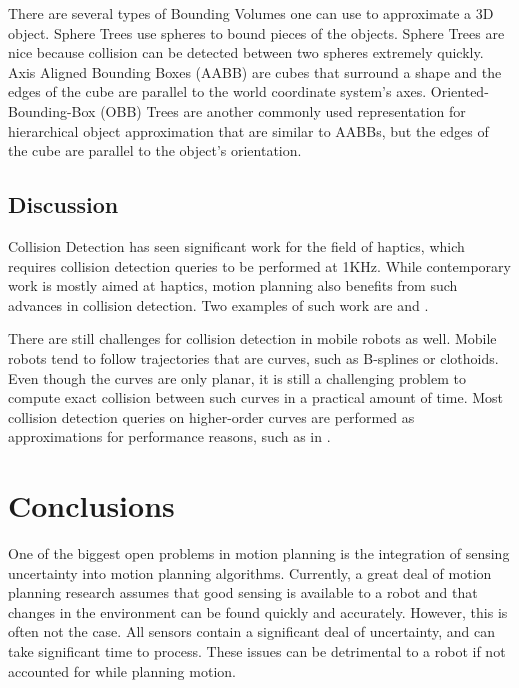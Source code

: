 \documentclass[10pt,conference]{ieeeconf}
\begin{document}
	There are several types of Bounding Volumes one can use to approximate a 3D object. Sphere Trees \cite{hubbard1996approximating} use spheres to bound pieces of the objects. Sphere Trees are nice because collision can be detected between two spheres extremely quickly. Axis Aligned Bounding Boxes (AABB) \cite{edelsbrunner1981intersection} are cubes that surround a shape and the edges of the cube are parallel to the world coordinate system's axes. Oriented-Bounding-Box (OBB) Trees \cite{gottschalk1996obbtree} are another commonly used representation for hierarchical object approximation that are similar to AABBs, but the edges of the cube are parallel to the object's orientation.
	 
	
\subsection{Discussion}

	Collision Detection has seen significant work for the field of haptics, which requires collision detection queries to be performed at 1KHz. While contemporary work is mostly aimed at haptics, motion planning also benefits from such advances in collision detection. Two examples of such work are \cite{otaduy2005sensation} and \cite{barbivc2008six}. 
	
	There are still challenges for collision detection in mobile robots as well. Mobile robots tend to follow trajectories that are curves, such as B-splines or clothoids. Even though the curves are only planar, it is still a challenging problem to compute exact collision between such curves in a practical amount of time. Most collision detection queries on higher-order curves are performed as approximations for performance reasons, such as in \cite{morken2009computing}.	
	



\section{Conclusions} \label{sec:conclusion}
    
    One of the biggest open problems in motion planning is the integration of sensing uncertainty into motion planning algorithms. Currently, a great deal of motion planning research assumes that good sensing is available to a robot and that changes in the environment can be found quickly and accurately. However, this is often not the case. All sensors contain a significant deal of uncertainty, and can take significant time to process. These issues can be detrimental to a robot if not accounted for while planning motion. 
    
\end{document}
